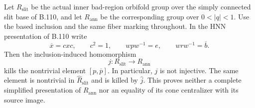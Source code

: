 \label{stmt:B111}
Let $R_{\mathrm{slit}}$ be the actual inner bad-region orbifold group
over the simply connected slit base of B.110, and let
$R_{\mathrm{ann}}$ be the corresponding group over $0<|q|<1$.
Use the based inclusion and the same fiber marking throughout.
In the HNN presentation of B.110 write
\[
 \overline{x}=cxc,\qquad c^2=1,\qquad
 w p w^{-1}=e,\qquad w r w^{-1}=\overline b.
\]
Then the inclusion-induced homomorphism
\[
 j:R_{\mathrm{slit}}\longrightarrow R_{\mathrm{ann}}
\]
kills the nontrivial element $[p,\overline p]$.
In particular, $j$ is not injective.  The same element is nontrivial
in $\widehat{R}_{\mathrm{slit}}$ and is killed by $\widehat j$.
This proves neither a complete simplified presentation of
$R_{\mathrm{ann}}$ nor an equality of its cone centralizer with its
source image.

